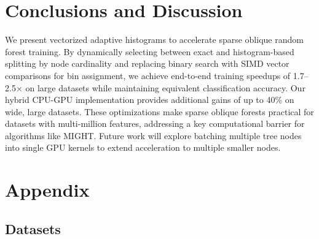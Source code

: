 \documentclass[sigconf]{acmart}
\begin{document}




\section{Conclusions and Discussion}

We present vectorized adaptive histograms to accelerate sparse oblique random forest training. By dynamically selecting between exact and histogram-based splitting by node cardinality and replacing binary search with SIMD vector comparisons for bin assignment, we achieve end-to-end training speedups of 1.7–2.5× on large datasets while maintaining equivalent classification accuracy. Our hybrid CPU-GPU implementation provides additional gains of up to 40\% on wide, large datasets. These optimizations make sparse oblique forests practical for datasets with multi-million features, addressing a key computational barrier for algorithms like MIGHT. Future work will explore batching multiple tree nodes into single GPU kernels to extend acceleration to multiple smaller nodes.




\appendix

\section{Appendix}

\subsection{Datasets}
\label{app:datasets}
\end{document}
